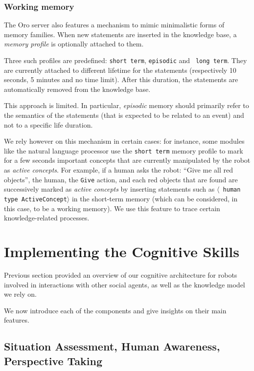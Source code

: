 \documentclass[preprint,3p,times]{elsarticle}
\newcommand{\concept}[1]{{\small \texttt{#1}}}
\newcommand{\stmt}[1]{{\footnotesize \tt $\langle$ #1\relax$\rangle$}}
\begin{document}
\subsubsection{Working memory}

The {\sc Oro} server also features a mechanism to mimic minimalistic forms of
memory families.  When new statements are inserted in the knowledge base, a
\emph{memory profile} is optionally attached to them.

Three such profiles are predefined: {\tt short term}, {\tt episodic} and {\tt
long term}. They are currently attached to different lifetime for the statements
(respectively 10 seconds, 5 minutes and no time limit). After this duration,
the statements are automatically removed from the knowledge base.

This approach is limited. In particular, \emph{episodic} memory should primarily
refer to the semantics of the statements (that is expected to be related to an
event) and not to a specific life duration.

We rely however on this mechanism in certain cases: for instance, some modules
like the natural language processor use the {\tt short term} memory profile to
mark for a few seconds important concepts that are currently manipulated by the
robot as \emph{active concepts}. For example, if a human asks the robot: ``Give
me all red objects'', the human, the \concept{Give} action, and each red
objects that are found are successively marked as \emph{active concepts} by
inserting statements such as \stmt{human type ActiveConcept} in the short-term
memory (which can be considered, in this case, to be a working memory). We use
this feature to trace certain knowledge-related processes.


\section{Implementing the Cognitive Skills}
\label{sec:impl}

Previous section provided an overview of our cognitive architecture for robots
involved in interactions with other social agents, as well as the knowledge
model we rely on.

We now introduce each of the components and give insights on their main
features.


\subsection{Situation Assessment, Human Awareness, Perspective Taking}
\label{sect|sit-ass}
\end{document}
